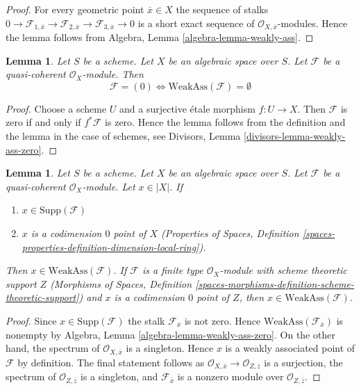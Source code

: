 \documentclass{stacks-project}
\theoremstyle{plain}
\newtheorem{lemma}[subsection]{Lemma}
\theoremstyle{definition}
\theoremstyle{remark}
\numberwithin{equation}{subsection}
\begin{document}
\begin{proof}
For every geometric point $\overline{x} \in X$
the sequence of stalks
$0 \to \mathcal{F}_{1, \overline{x}} \to
\mathcal{F}_{2, \overline{x}} \to
\mathcal{F}_{3, \overline{x}} \to 0$
is a short exact sequence of $\mathcal{O}_{X, \overline{x}}$-modules.
Hence the lemma follows from
Algebra, Lemma \ref{algebra-lemma-weakly-ass}.
\end{proof}

\begin{lemma}
\label{lemma-weakly-ass-zero}
Let $S$ be a scheme. Let $X$ be an algebraic space over $S$.
Let $\mathcal{F}$ be a quasi-coherent $\mathcal{O}_X$-module.
Then
$$
\mathcal{F} = (0) \Leftrightarrow \text{WeakAss}(\mathcal{F}) = \emptyset
$$
\end{lemma}

\begin{proof}
Choose a scheme $U$ and a surjective \'etale morphism $f : U \to X$.
Then $\mathcal{F}$ is zero if and only if $f^*\mathcal{F}$ is zero.
Hence the lemma follows from the definition and the lemma in the
case of schemes, see
Divisors, Lemma \ref{divisors-lemma-weakly-ass-zero}.
\end{proof}

\begin{lemma}
\label{lemma-minimal-support-in-weakly-ass}
Let $S$ be a scheme. Let $X$ be an algebraic space over $S$.
Let $\mathcal{F}$ be a quasi-coherent $\mathcal{O}_X$-module.
Let $x \in |X|$. If
\begin{enumerate}
\item $x \in \text{Supp}(\mathcal{F})$
\item $x$ is a codimension $0$ point of $X$
(Properties of Spaces, Definition
\ref{spaces-properties-definition-dimension-local-ring}).
\end{enumerate}
Then $x \in \text{WeakAss}(\mathcal{F})$. If $\mathcal{F}$
is a finite type $\mathcal{O}_X$-module with scheme theoretic support $Z$
(Morphisms of Spaces, Definition
\ref{spaces-morphisms-definition-scheme-theoretic-support})
and $x$ is a codimension $0$ point of $Z$, then
$x \in \text{WeakAss}(\mathcal{F})$.
\end{lemma}

\begin{proof}
Since $x \in \text{Supp}(\mathcal{F})$ the stalk
$\mathcal{F}_{\overline{x}}$ is not zero. Hence
$\text{WeakAss}(\mathcal{F}_{\overline{x}})$
is nonempty by
Algebra, Lemma \ref{algebra-lemma-weakly-ass-zero}.
On the other hand, the spectrum of $\mathcal{O}_{X, \overline{x}}$
is a singleton. Hence $x$ is a weakly associated point of
$\mathcal{F}$ by definition. The final statement follows
as $\mathcal{O}_{X, \overline{x}} \to \mathcal{O}_{Z, \overline{z}}$
is a surjection, the spectrum of $\mathcal{O}_{Z, \overline{z}}$
is a singleton, and $\mathcal{F}_{\overline{x}}$ is a nonzero
module over $\mathcal{O}_{Z, \overline{z}}$.
\end{proof}
\end{document}
